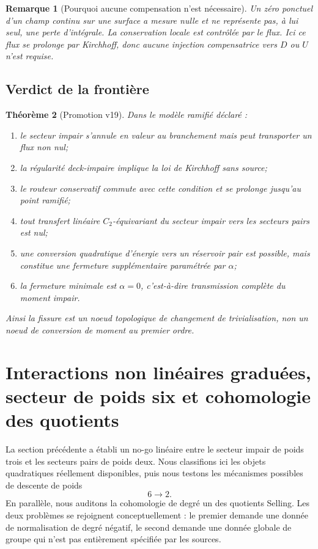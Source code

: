 \documentclass[11pt,a4paper]{article}
\newtheorem{theorem}{Théorème}[section]
\newtheorem{remark}[theorem]{Remarque}
\begin{document}
\begin{remark}[Pourquoi aucune compensation n'est nécessaire]
Un zéro ponctuel d'un champ continu sur une surface a mesure nulle et ne représente pas, à lui seul, une perte d'intégrale. La conservation locale est contrôlée par le flux. Ici ce flux se prolonge par Kirchhoff, donc aucune injection compensatrice vers $D$ ou $U$ n'est requise.
\end{remark}

\subsection{Verdict de la frontière}

\begin{theorem}[Promotion v19]\label{thm:v19-verdict}
Dans le modèle ramifié déclaré :
\begin{enumerate}[label=\textup{(\roman*)}]
\item le secteur impair s'annule en valeur au branchement mais peut transporter un flux non nul;
\item la régularité deck-impaire implique la loi de Kirchhoff sans source;
\item le routeur conservatif commute avec cette condition et se prolonge jusqu'au point ramifié;
\item tout transfert linéaire $C_2$-équivariant du secteur impair vers les secteurs pairs est nul;
\item une conversion quadratique d'énergie vers un réservoir pair est possible, mais constitue une fermeture supplémentaire paramétrée par $\alpha$;
\item la fermeture minimale est $\alpha=0$, c'est-à-dire transmission complète du moment impair.
\end{enumerate}
Ainsi la fissure est un noeud topologique de changement de trivialisation, non un noeud de conversion de moment au premier ordre.
\end{theorem}


\section{Interactions non linéaires graduées, secteur de poids six et cohomologie des quotients}\label{sec:v20-graded-nonlinear-H1}

La section précédente a établi un no-go linéaire entre le secteur impair de poids trois et les secteurs pairs de poids deux. Nous classifions ici les objets quadratiques réellement disponibles, puis nous testons les mécanismes possibles de descente de poids
\[
 6\longrightarrow2.
\]
En parallèle, nous auditons la cohomologie de degré un des quotients Selling. Les deux problèmes se rejoignent conceptuellement : le premier demande une donnée de normalisation de degré négatif, le second demande une donnée globale de groupe qui n'est pas entièrement spécifiée par les sources.
\end{document}

